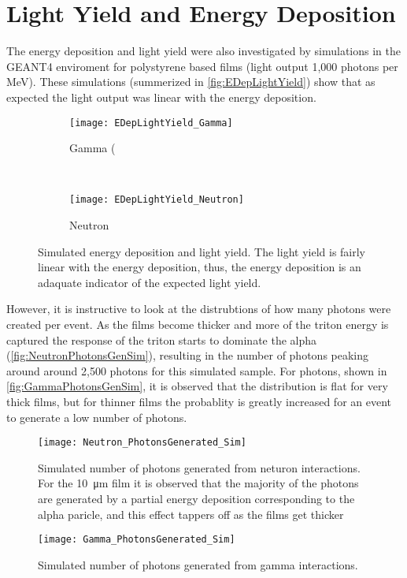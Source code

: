 \section{Light Yield and Energy Deposition}
The energy deposition and light yield were also investigated by simulations in the GEANT4 enviroment for polystyrene based films (light output 1,000 photons per MeV).
These simulations (summerized in \autoref{fig:EDepLightYield}) show that as expected the light output was linear with the energy deposition.
\begin{figure*}[ht]
	\centering
	\begin{subfigure}[b]{0.45\textwidth}
    		\texttt{[image: EDepLightYield\_Gamma]}
		\caption{ Gamma (}
	\end{subfigure}%
	~
	\begin{subfigure}[b]{0.45\textwidth}
    		\texttt{[image: EDepLightYield\_Neutron]}
		  \caption{ Neutron}
	\end{subfigure}%
  \caption[Energy Depostion and Light Yield]{Simulated energy deposition and light yield.  The light yield is fairly linear with the energy deposition, thus, the energy deposition is an adaquate indicator of the expected light yield.}
  \label{fig:EDepLightYield}
\end{figure*}
However, it is instructive to look at the distrubtions of how many photons were created per event.
As the films become thicker and more of the triton energy is captured the response of the triton starts to dominate the alpha (\autoref{fig:NeutronPhotonsGenSim}), resulting in the number of photons peaking around around 2,500 photons for this simulated sample.
For photons, shown in \autoref{fig:GammaPhotonsGenSim}, it is observed that the distribution is flat for very thick films, but for thinner films the probablity is greatly increased for an event to generate a low number of photons.
\begin{figure}
  \centering
  \texttt{[image: Neutron\_PhotonsGenerated\_Sim]}
  \caption[Number of photons generated from neutron interactions]{Simulated number of photons generated from neturon interactions.  For the \SI{10}{\um} film it is observed that the majority of the photons are generated by a partial energy deposition corresponding to the alpha paricle, and this effect tappers off as the films get thicker}
  \label{fig:NeutronPhotonsGenSim}
\end{figure}
\begin{figure}
  \centering
  \texttt{[image: Gamma\_PhotonsGenerated\_Sim]}
  \caption[Number of photons generated from gamma interactions]{Simulated number of photons generated from gamma interactions.}
  \label{fig:GammaPhotonsGenSim}
\end{figure}

